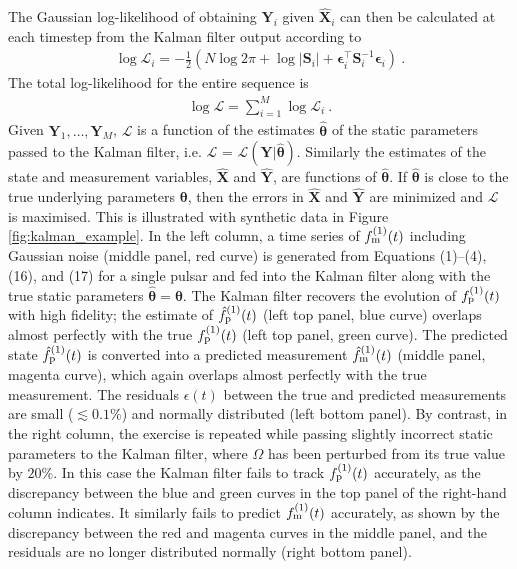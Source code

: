 \documentclass[fleqn,usenatbib,useAMS]{mnras}
\begin{document}
The Gaussian log-likelihood of obtaining ${\boldsymbol{Y}}_i$ given ${\boldsymbol{\hat X}}_i$ can  then be calculated at each timestep from the Kalman filter output according to
\begin{eqnarray}
	\log \mathcal{L}_i =  -\frac{1}{2} \left (N \log 2 \pi + \log  \left | \boldsymbol{S}_i \right | + \boldsymbol{\epsilon}_i^{\intercal} \boldsymbol{S}_i^{-1}  \boldsymbol{\epsilon}_i \right ) \ .
\end{eqnarray}
The total log-likelihood for the entire sequence is
\begin{eqnarray}
	\log \mathcal{L} =  \sum_{i=1}^{M} \log \mathcal{L}_i \ . \label{eq:likelihood}
\end{eqnarray}
Given ${\boldsymbol{Y}}_1, \dots, {\boldsymbol{Y}}_M$, $\mathcal{L}$ is a function of the estimates ${\boldsymbol{\hat \theta}}$ of the static parameters passed to the Kalman filter, i.e. $\mathcal{L}$ = $\mathcal{L}(\boldsymbol{Y} | \boldsymbol{\hat \theta})$. Similarly the estimates of the state and measurement variables, $\hat{\boldsymbol{X}}$ and $\hat{\boldsymbol{Y}}$, are functions of $\boldsymbol{\hat \theta}$. If $\boldsymbol{\hat{\theta}}$ is close to the true underlying parameters $\boldsymbol{\theta}$, then the errors in $\hat{\boldsymbol{X}}$ and $\hat{\boldsymbol{Y}}$ are minimized and $\mathcal{L}$ is maximised. This is illustrated with synthetic data in Figure \ref{fig:kalman_example}. In the left column, a time series of $f_{\rm m}^{(1)}(t)$ including Gaussian noise (middle panel, red curve) is generated from Equations (1)--(4), (16), and (17) for a single pulsar and fed into the Kalman filter along with the true static parameters ${\boldsymbol{\hat \theta}} = {\boldsymbol{\theta}}$. The Kalman filter recovers the evolution of $f_{\rm p}^{(1)}(t)$ with high fidelity; the estimate of $\hat{f}_{\rm p}^{(1)}(t)$ (left top panel, blue curve) overlaps almost perfectly with the true $f_{\rm p}^{(1)}(t)$ (left top panel, green curve). The predicted state $\hat{f}_{\rm p}^{(1)}(t)$ is converted  into a predicted measurement $\hat{f}_{\rm m}^{(1)}(t)$ (middle panel, magenta curve), which again overlaps almost perfectly with the true measurement. The residuals $\epsilon(t)$ between the true and predicted measurements are small ($\lesssim 0.1\%$) and normally distributed (left bottom panel). By contrast, in the right column, the exercise is repeated while passing slightly incorrect static parameters to the Kalman filter, where $\Omega$ has been perturbed from its true value by $20 \%$. In this case the Kalman filter fails to track $f_{\rm p}^{(1)}(t)$ accurately, as the discrepancy between the blue and green curves in the top panel of the right-hand column indicates. It similarly fails to predict $f_{\rm m}^{(1)}(t)$ accurately, as shown by the discrepancy between the red and magenta curves in the middle panel, and the residuals are no longer distributed normally (right bottom panel).
\end{document}
